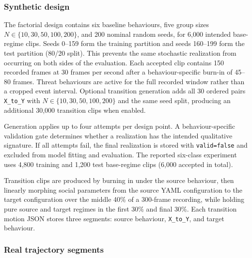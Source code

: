 \documentclass[11pt]{article}
\begin{document}
\subsubsection{Synthetic design}

The factorial design contains six baseline behaviours, five group sizes
\(N\in\{10,30,50,100,200\}\), and 200 nominal random seeds, for 6{,}000 intended base-regime clips.
Seeds 0--159 form the training partition and seeds 160--199 form the test partition (80/20 split).
This prevents the same stochastic realization from occurring on both sides of the evaluation. Each
accepted clip contains 150 recorded frames at 30 frames per second after a behaviour-specific burn-in
of 45--80 frames. Threat behaviours are active for the full recorded window rather than a cropped
event interval. Optional transition generation adds all 30 ordered pairs
\texttt{X\_to\_Y} with \(N\in\{10,30,50,100,200\}\) and the same seed split, producing an additional
30{,}000 transition clips when enabled.

Generation applies up to four attempts per design point. A behaviour-specific validation gate determines
whether a realization has the intended qualitative signature. If all attempts fail, the final realization
is stored with \texttt{valid=false} and excluded from model fitting and evaluation. The reported six-class
experiment uses 4{,}800 training and 1{,}200 test base-regime clips (6{,}000 accepted in total).

Transition clips are produced by burning in under the source behaviour, then linearly morphing social
parameters from the source YAML configuration to the target configuration over the middle 40\% of a
300-frame recording, while holding pure source and target regimes in the first 30\% and final 30\%.
Each transition motion JSON stores three segments: source behaviour, \texttt{X\_to\_Y}, and target
behaviour.

\subsubsection{Real trajectory segments}
\end{document}
